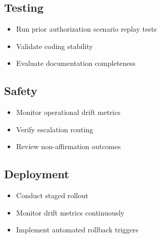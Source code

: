 \documentclass[11pt]{article}
\begin{document}
\subsection{Testing}

\begin{itemize}
\item Run prior authorization scenario replay tests
\item Validate coding stability
\item Evaluate documentation completeness
\end{itemize}

\subsection{Safety}

\begin{itemize}
\item Monitor operational drift metrics
\item Verify escalation routing
\item Review non-affirmation outcomes
\end{itemize}

\subsection{Deployment}

\begin{itemize}
\item Conduct staged rollout
\item Monitor drift metrics continuously
\item Implement automated rollback triggers
\end{itemize}



\end{document}
